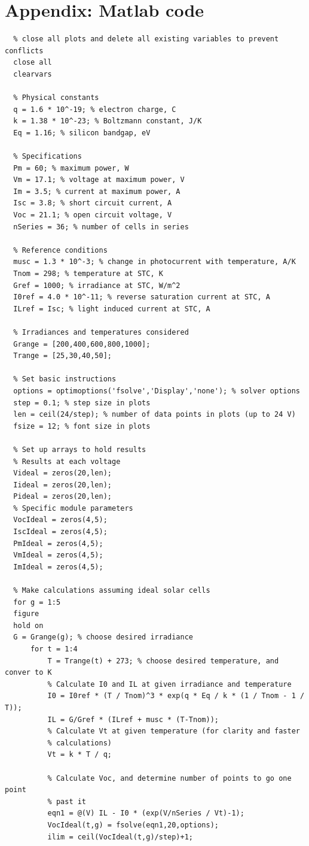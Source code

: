 \documentclass[fleqn]{article}
\begin{document}
\section{Appendix: Matlab code}
\begin{lstlisting}
  % close all plots and delete all existing variables to prevent conflicts
  close all
  clearvars

  % Physical constants
  q = 1.6 * 10^-19; % electron charge, C
  k = 1.38 * 10^-23; % Boltzmann constant, J/K
  Eq = 1.16; % silicon bandgap, eV

  % Specifications
  Pm = 60; % maximum power, W
  Vm = 17.1; % voltage at maximum power, V
  Im = 3.5; % current at maximum power, A
  Isc = 3.8; % short circuit current, A
  Voc = 21.1; % open circuit voltage, V
  nSeries = 36; % number of cells in series

  % Reference conditions
  musc = 1.3 * 10^-3; % change in photocurrent with temperature, A/K
  Tnom = 298; % temperature at STC, K
  Gref = 1000; % irradiance at STC, W/m^2
  I0ref = 4.0 * 10^-11; % reverse saturation current at STC, A
  ILref = Isc; % light induced current at STC, A

  % Irradiances and temperatures considered
  Grange = [200,400,600,800,1000];
  Trange = [25,30,40,50];

  % Set basic instructions
  options = optimoptions('fsolve','Display','none'); % solver options
  step = 0.1; % step size in plots
  len = ceil(24/step); % number of data points in plots (up to 24 V)
  fsize = 12; % font size in plots

  % Set up arrays to hold results
  % Results at each voltage
  Videal = zeros(20,len);
  Iideal = zeros(20,len);
  Pideal = zeros(20,len);
  % Specific module parameters
  VocIdeal = zeros(4,5);
  IscIdeal = zeros(4,5);
  PmIdeal = zeros(4,5);
  VmIdeal = zeros(4,5);
  ImIdeal = zeros(4,5);

  % Make calculations assuming ideal solar cells
  for g = 1:5
  figure
  hold on
  G = Grange(g); % choose desired irradiance
      for t = 1:4
          T = Trange(t) + 273; % choose desired temperature, and conver to K
          % Calculate I0 and IL at given irradiance and temperature
          I0 = I0ref * (T / Tnom)^3 * exp(q * Eq / k * (1 / Tnom - 1 / T));
          IL = G/Gref * (ILref + musc * (T-Tnom));
          % Calculate Vt at given temperature (for clarity and faster
          % calculations)
          Vt = k * T / q;
          
          % Calculate Voc, and determine number of points to go one point
          % past it
          eqn1 = @(V) IL - I0 * (exp(V/nSeries / Vt)-1);
          VocIdeal(t,g) = fsolve(eqn1,20,options);
          ilim = ceil(VocIdeal(t,g)/step)+1;
          

\end{lstlisting}
\end{document}

